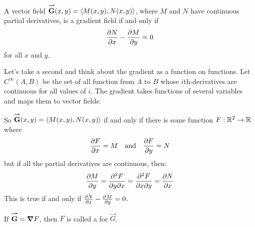 \documentclass{ximera}
\begin{document}
\begin{theorem}[Clairaut]
  A vector field $\vec{G}(x,y) = \vector{M(x,y),N(x,y)}$, where $M$ and
  $N$ have continuous partial derivatives, is a gradient field if and
  only if
  \[
  \pp[N]{x} -\pp[M]{y} = 0
  \]
  for all $x$ and $y$.
  \begin{explanation}
    Let's take a second and think about the gradient as a function on
    functions. Let $C^\infty(A,B)$ be the set of all function from $A$
    to $B$ whose $i$th-derivatives are continuous for all values of
    $i$. The gradient takes functions of several variables and maps
    them to vector fields:
\begin{image}
\end{image}
So $\vec{G}(x,y) = \vector{M(x,y),N(x,y)}$ if and only if there is
some function $F:\R^2\to\R$ where
\[
\pp[F]{x} = M \quad \text{and}\quad \pp[F]{y} = N
\]
but if all the partial derivatives are continuous, then:
\[
\pp[M]{y} = \frac{\partial^2 F}{\partial y\partial x} =  \frac{\partial^2 F}{\partial x\partial y} = \pp[N]{x}
\]
This is true if and only if $\pp[N]{x} -\pp[M]{y} = 0$.
  \end{explanation}
\end{theorem}


\begin{definition}
  If $\vec{G} = \grad F$, then $F$ is called a  for $\vec{G}$.
\end{definition}
\end{document}

